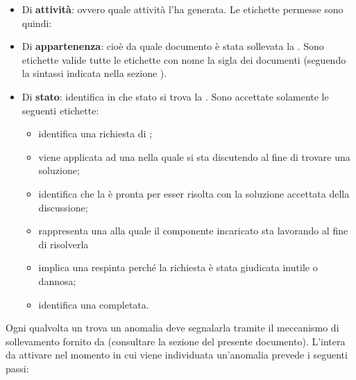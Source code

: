 				\begin{itemize}
				    \item Di \textbf{attività}: ovvero quale attività l'ha generata. Le etichette permesse sono quindi: 
				    \item Di \textbf{appartenenza}: cioè da quale documento è stata sollevata la . Sono etichette valide tutte le etichette con nome la sigla dei documenti (seguendo la sintassi indicata nella sezione ).
				    \item Di \textbf{stato}: identifica in che stato si trova la . Sono accettate solamente le seguenti etichette:
				\begin{itemize}
				    \item {} identifica una richiesta di ;
				    \item {} viene applicata ad una  nella quale si sta discutendo al fine di trovare una soluzione;
				    \item {} identifica che la  è pronta per esser risolta con la soluzione accettata della discussione;
				    \item {} rappresenta una  alla quale il componente incaricato sta lavorando al fine di risolverla
				    \item {} implica una  respinta perché la richiesta è stata giudicata inutile o dannosa;
				    \item {} identifica una  completata.
				\end{itemize}
				\end{itemize}
				Ogni qualvolta un  trova un anomalia deve segnalarla tramite il meccanismo di sollevamento  fornito da  (consultare la sezione  del presente documento). L'intera  da attivare nel momento in cui viene individuata un'anomalia prevede i seguenti passi:
